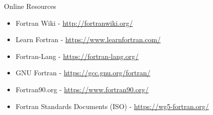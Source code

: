 \begin{frame}[fragile]{Online Resources}
\begin{itemize}
\item Fortran Wiki - \url{http://fortranwiki.org/} 
\item Learn Fortran - \url{https://www.learnfortran.com/} 
\item Fortran-Lang - \url{https://fortran-lang.org/}
\item GNU Fortran - \url{https://gcc.gnu.org/fortran/} 
\item Fortran90.org - \url{https://www.fortran90.org/} 
\item Fortran Standards Documents (ISO) - \url{https://wg5-fortran.org/}
\end{itemize}
\end{frame}
